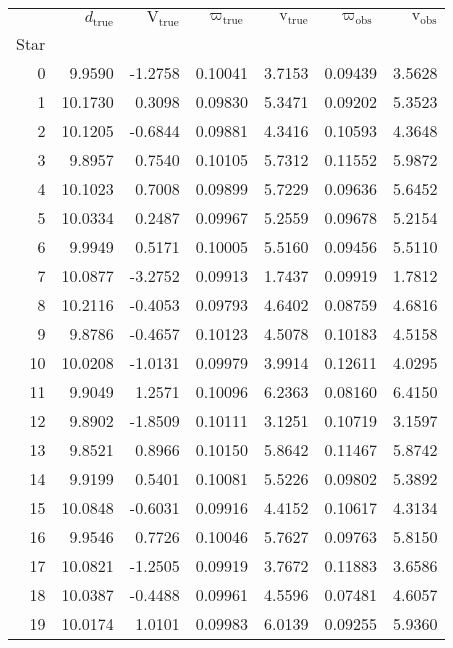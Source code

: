 \begin{tabular}{r|rrrr|rr}
\toprule
 & $d_\mathrm{true}$ & $\mathrm{V_{true}}$ & $\varpi_\mathrm{true}$ & $\mathrm{v_{true}}$ & $\varpi_\mathrm{obs}$ & $\mathrm{v_{obs}}$ \\
Star &  &  &  &  &  &  \\
\midrule
0 & 9.9590 & -1.2758 & 0.10041 & 3.7153 & 0.09439 & 3.5628 \\
1 & 10.1730 & 0.3098 & 0.09830 & 5.3471 & 0.09202 & 5.3523 \\
2 & 10.1205 & -0.6844 & 0.09881 & 4.3416 & 0.10593 & 4.3648 \\
3 & 9.8957 & 0.7540 & 0.10105 & 5.7312 & 0.11552 & 5.9872 \\
4 & 10.1023 & 0.7008 & 0.09899 & 5.7229 & 0.09636 & 5.6452 \\
5 & 10.0334 & 0.2487 & 0.09967 & 5.2559 & 0.09678 & 5.2154 \\
6 & 9.9949 & 0.5171 & 0.10005 & 5.5160 & 0.09456 & 5.5110 \\
7 & 10.0877 & -3.2752 & 0.09913 & 1.7437 & 0.09919 & 1.7812 \\
8 & 10.2116 & -0.4053 & 0.09793 & 4.6402 & 0.08759 & 4.6816 \\
9 & 9.8786 & -0.4657 & 0.10123 & 4.5078 & 0.10183 & 4.5158 \\
10 & 10.0208 & -1.0131 & 0.09979 & 3.9914 & 0.12611 & 4.0295 \\
11 & 9.9049 & 1.2571 & 0.10096 & 6.2363 & 0.08160 & 6.4150 \\
12 & 9.8902 & -1.8509 & 0.10111 & 3.1251 & 0.10719 & 3.1597 \\
13 & 9.8521 & 0.8966 & 0.10150 & 5.8642 & 0.11467 & 5.8742 \\
14 & 9.9199 & 0.5401 & 0.10081 & 5.5226 & 0.09802 & 5.3892 \\
15 & 10.0848 & -0.6031 & 0.09916 & 4.4152 & 0.10617 & 4.3134 \\
16 & 9.9546 & 0.7726 & 0.10046 & 5.7627 & 0.09763 & 5.8150 \\
17 & 10.0821 & -1.2505 & 0.09919 & 3.7672 & 0.11883 & 3.6586 \\
18 & 10.0387 & -0.4488 & 0.09961 & 4.5596 & 0.07481 & 4.6057 \\
19 & 10.0174 & 1.0101 & 0.09983 & 6.0139 & 0.09255 & 5.9360 \\
\bottomrule
\end{tabular}
